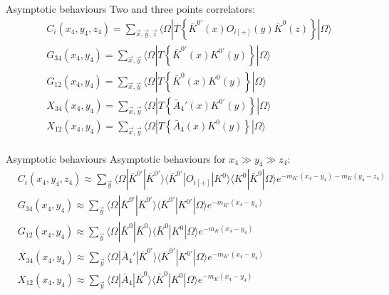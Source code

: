 \documentclass{beamer}
\newcommand{\la}{\langle}
\newcommand{\ra}{\rangle}
\begin{document}
\begin{frame}{Asymptotic behaviours}
      Two and three points correlators:
      \begin{equation*}
            \begin{split}
                  & C_i (x_4,y_4,z_4) = \sum_{\vec x,\vec y,\vec z}     \la \Omega | T \left\{ \bar K^{0'}(x)O_{i[+]}(y)\bar K^{0} (z) \right\} | \Omega \ra \\
                  & G_{34} (x_4,y_4) = \sum_{\vec x,\vec y}             \la \Omega | T \left\{ \bar K^{0'} (x) K^{0'} (y)              \right\} | \Omega \ra \\
                  & G_{12} (x_4,y_4) = \sum_{\vec x,\vec y}             \la \Omega | T \left\{ \bar K^{0} (x) K^{0} (y)                \right\} | \Omega \ra \\
                  & X_{34} (x_4,y_4) = \sum_{\vec x,\vec y}             \la \Omega | T \left\{ \bar A_{4}' (x) K^{0'} (y)              \right\} | \Omega \ra \\
                  & X_{12} (x_4,y_4) = \sum_{\vec x,\vec y}             \la \Omega | T \left\{ \bar A_{4} (x) K^{0} (y)                \right\} | \Omega \ra \\                  
            \end{split}
      \end{equation*}
\end{frame}

\begin{frame}{Asymptotic behaviours}
      Asymptotic behaviours for $x_4 \gg y_4 \gg z_4$:
      \begin{equation*}
            \begin{split}
                  & C_i (x_4,y_4,z_4) \approx \sum_{\vec{y}} \la \Omega | \bar K^{0'} | \bar K^{0'} \ra \la \bar K^{0'} | O_{i[+]} | K^{0} \ra \la K^{0} | \bar K^{0} | \Omega \ra e^{-m_{K'} (x_4-y_4)-m_K (y_4-z_4)}\\
                  & G_{34} (x_4,y_4)  \approx \sum_{\vec{y}} \la \Omega | \bar K^{0'} | \bar K^{0'} \ra \la \bar K^{0'} | K^{0'}                    | \Omega \ra e^{-m_{K'} (x_4-y_4)} \\
                  & G_{12} (x_4,y_4)  \approx \sum_{\vec{y}} \la \Omega | \bar K^{0}  | \bar K^{0}  \ra \la \bar K^{0}  | K^{0}                     | \Omega \ra e^{-m_K (x_4-y_4)}    \\
                  & X_{34} (x_4,y_4)  \approx \sum_{\vec{y}} \la \Omega | \bar A_{4}' | \bar K^{0'} \ra \la \bar K^{0'} | K^{0'}                    | \Omega \ra e^{-m_{K'} (x_4-y_4)} \\
                  & X_{12} (x_4,y_4)  \approx \sum_{\vec{y}} \la \Omega | \bar A_{4}  | \bar K^{0}  \ra \la \bar K^{0}  | K^{0}                     | \Omega \ra e^{-m_K (x_4-y_4)}    \\                  
            \end{split}
      \end{equation*}
\end{frame}
\end{document}
